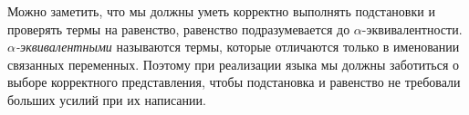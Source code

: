 Можно заметить, что мы должны уметь корректно выполнять подстановки и проверять термы на равенство, равенство подразумевается до $\alpha$-эквивалентности. \textit{$\alpha$-эквивалентными} называются термы, которые отличаются только в именовании связанных переменных. Поэтому при реализации языка мы должны заботиться о выборе корректного представления, чтобы подстановка и равенство не требовали больших усилий при их написании.





